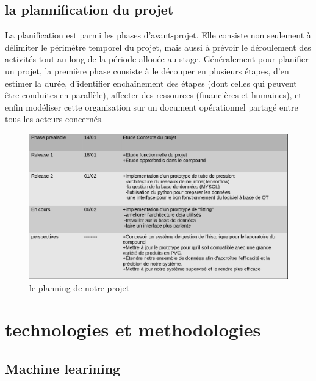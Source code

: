 \documentclass[11pt]{report}
\begin{document}
\section{la plannification du projet }
La planification est parmi les phases d'avant-projet. Elle consiste non seulement à délimiter le
périmètre temporel du projet, mais aussi à prévoir le déroulement des activités tout au long de la
période allouée au stage.
Généralement pour planifier un projet, la première phase consiste à le découper en plusieurs
étapes, d'en estimer la durée, d'identifier enchaînement des étapes (dont celles qui peuvent être
conduites en parallèle), affecter des ressources (financières et humaines), et enfin modéliser cette
organisation sur un document opérationnel partagé entre tous les acteurs concernés.
\\
\begin{figure}[H]
	\begin{center}
		\includegraphics[width=15cm]{images/agile.png}
		\caption{le planning de notre projet}
		\label{fig:figure}
	\end{center}
\end{figure}


\chapter{technologies et methodologies}

\section{Machine learining}
\end{document}
